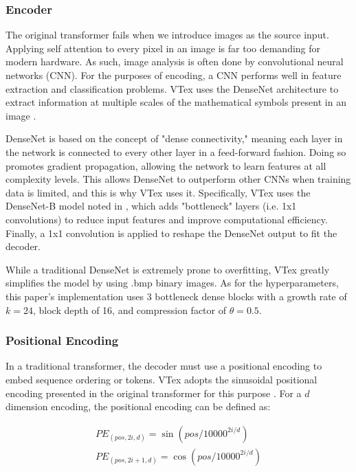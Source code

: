 \subsubsection{Encoder}
The original transformer fails when we introduce images as the source input. Applying self attention to every pixel in an image is far too demanding for modern hardware. As such, image analysis is often done by convolutional neural networks (CNN). For the purposes of encoding, a CNN performs well in feature extraction and classification problems. VTex uses the DenseNet architecture to extract information at multiple scales of the mathematical symbols present in an image \cite{Densenet2017}.

DenseNet is based on the concept of "dense connectivity," meaning each layer in the network is connected to every other layer in a feed-forward fashion. Doing so promotes gradient propagation, allowing the network to learn features at all complexity levels. This allows DenseNet to outperform other CNNs when training data is limited, and this is why VTex uses it. Specifically, VTex uses the DenseNet-B model noted in \cite{Densenet2017}, which adds "bottleneck" layers (i.e. 1x1 convolutions) to reduce input features and improve computational efficiency. Finally, a 1x1 convolution is applied to reshape the DenseNet output to fit the decoder.

While a traditional DenseNet is extremely prone to overfitting, VTex greatly simplifies the model by using .bmp binary images. As for the hyperparameters, this paper's implementation uses 3 bottleneck dense blocks with a growth rate of $k=24$, block depth of 16, and compression factor of $\theta = 0.5$.

\subsubsection{Positional Encoding} \label{sec:positionalencoding}
In a traditional transformer, the decoder must use a positional encoding to embed sequence ordering or tokens. VTex adopts the sinusoidal positional encoding presented in the original transformer for this purpose \cite{Attention}.
For a $d$ dimension encoding, the positional encoding can be defined as:

\begin{equation} \label{eq:wordposenc}
\begin{split}
PE_{(pos, 2i, d)} = \sin(pos/10000^{2i/d}) \\
PE_{(pos, 2i+1, d)} = \cos(pos/10000^{2i/d})
\end{split}
\end{equation}

